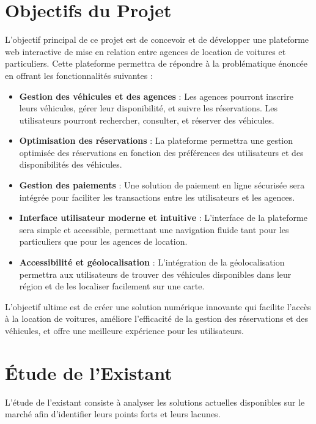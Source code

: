 \section{Objectifs du Projet}
L'objectif principal de ce projet est de concevoir et de développer une plateforme web interactive de mise en relation entre agences de location de voitures et particuliers. Cette plateforme permettra de répondre à la problématique énoncée en offrant les fonctionnalités suivantes :
\begin{itemize}
    \item \textbf{Gestion des véhicules et des agences} : Les agences pourront inscrire leurs véhicules, gérer leur disponibilité, et suivre les réservations. Les utilisateurs pourront rechercher, consulter, et réserver des véhicules.
    \item \textbf{Optimisation des réservations} : La plateforme permettra une gestion optimisée des réservations en fonction des préférences des utilisateurs et des disponibilités des véhicules.
    \item \textbf{Gestion des paiements} : Une solution de paiement en ligne sécurisée sera intégrée pour faciliter les transactions entre les utilisateurs et les agences.
    \item \textbf{Interface utilisateur moderne et intuitive} : L'interface de la plateforme sera simple et accessible, permettant une navigation fluide tant pour les particuliers que pour les agences de location.
    \item \textbf{Accessibilité et géolocalisation} : L’intégration de la géolocalisation permettra aux utilisateurs de trouver des véhicules disponibles dans leur région et de les localiser facilement sur une carte.
\end{itemize}

L'objectif ultime est de créer une solution numérique innovante qui facilite l'accès à la location de voitures, améliore l'efficacité de la gestion des réservations et des véhicules, et offre une meilleure expérience pour les utilisateurs.

\section{Étude de l'Existant}
L'étude de l'existant consiste à analyser les solutions actuelles disponibles sur le marché afin d’identifier leurs points forts et leurs lacunes. 

